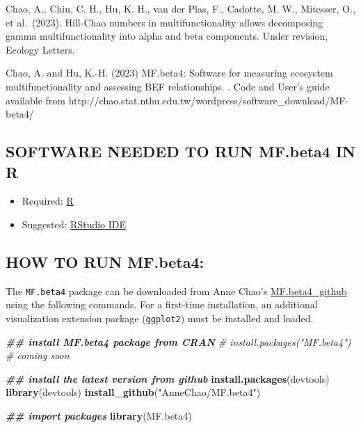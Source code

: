 \documentclass[
]{article}
\newenvironment{Shaded}{\begin{snugshade}}{\end{snugshade}}
\newcommand{\CommentTok}[1]{\textcolor[rgb]{0.56,0.35,0.01}{\textit{#1}}}
\newcommand{\DocumentationTok}[1]{\textcolor[rgb]{0.56,0.35,0.01}{\textbf{\textit{#1}}}}
\newcommand{\FunctionTok}[1]{\textcolor[rgb]{0.13,0.29,0.53}{\textbf{#1}}}
\newcommand{\NormalTok}[1]{#1}
\newcommand{\StringTok}[1]{\textcolor[rgb]{0.31,0.60,0.02}{#1}}
\providecommand{\tightlist}{%
  \setlength{\itemsep}{0pt}\setlength{\parskip}{0pt}}
\begin{document}
Chao, A., Chiu, C. H., Hu, K. H., van der Plas, F., Cadotte, M. W.,
Mitesser, O., et al.~(2023). Hill-Chao numbers in multifunctionality
allows decomposing gamma multifunctionality into alpha and beta
components. Under revision, Ecology Letters.

Chao, A. and Hu, K.-H. (2023) MF.beta4: Software for measuring ecosystem
multifunctionality and assessing BEF relationships. . Code and User's
guide available from
http://chao.stat.nthu.edu.tw/wordpress/software\_download/MF-beta4/

\hypertarget{software-needed-to-run-mf.beta4-in-r}{%
\subsection{SOFTWARE NEEDED TO RUN MF.beta4 IN
R}\label{software-needed-to-run-mf.beta4-in-r}}

\begin{itemize}
\tightlist
\item
  Required: \href{https://cran.r-project.org/}{R}
\item
  Suggested:
  \href{https://www.rstudio.com/products/RStudio/\#Desktop}{RStudio IDE}
\end{itemize}

\hypertarget{how-to-run-mf.beta4}{%
\subsection{HOW TO RUN MF.beta4:}\label{how-to-run-mf.beta4}}

The \texttt{MF.beta4} package can be downloaded from Anne Chao's
\href{https://github.com/AnneChao/MF.beta4}{MF.beta4\_github} using the
following commands. For a first-time installation, an additional
visualization extension package (\texttt{ggplot2}) must be installed and
loaded.

\begin{Shaded}
\begin{Highlighting}[]
\DocumentationTok{\#\# install MF.beta4 package from CRAN}
\CommentTok{\# install.packages("MF.beta4")  \# coming soon}

\DocumentationTok{\#\# install the latest version from github}
\FunctionTok{install.packages}\NormalTok{(}\StringTok{\textquotesingle{}devtools\textquotesingle{}}\NormalTok{)}
\FunctionTok{library}\NormalTok{(devtools)}
\FunctionTok{install\_github}\NormalTok{(}\StringTok{"AnneChao/MF.beta4"}\NormalTok{)}

\DocumentationTok{\#\# import packages}
\FunctionTok{library}\NormalTok{(MF.beta4)}
\end{Highlighting}
\end{Shaded}
\end{document}
